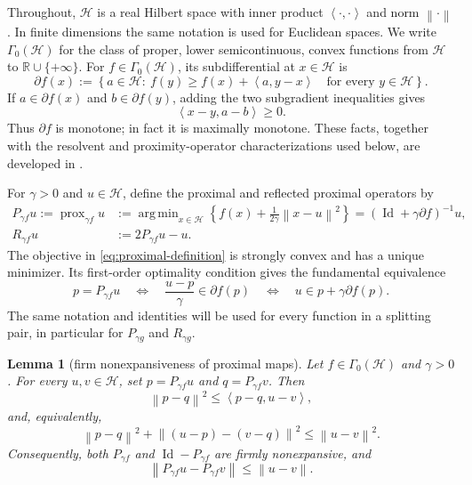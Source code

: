 \documentclass[10pt,leqno]{amsart}
\numberwithin{equation}{section}
\numberwithin{algorithm}{section}
\newtheorem{lemma}[theorem]{Lemma}
\theoremstyle{remark}
\newcommand{\Hcal}{\mathcal{H}}
\newcommand{\R}{\mathbb{R}}
\newcommand{\Id}{\operatorname{Id}}
\newcommand{\subd}{\partial}
\DeclareMathOperator{\prox}{prox}
\DeclareMathOperator{\argmin}{arg\,min}
\newcommand{\norm}[1]{\left\lVert #1 \right\rVert}
\newcommand{\ip}[2]{\left\langle #1,#2 \right\rangle}
\begin{document}
Throughout, $\Hcal$ is a real Hilbert space with inner product $\ip{\cdot}{\cdot}$ and norm $\norm{\cdot}$.  In finite dimensions the same notation is used for Euclidean spaces.  We write $\Gamma_0(\Hcal)$ for the class of proper, lower semicontinuous, convex functions from $\Hcal$ to $\R\cup\{+\infty\}$.  For $f\in\Gamma_0(\Hcal)$, its subdifferential at $x\in\Hcal$ is
\begin{equation}
\label{eq:subdifferential-definition}
  \subd f(x)
  :=\left\{a\in\Hcal:\
  f(y)\ge f(x)+\ip{a}{y-x}\quad\text{for every }y\in\Hcal\right\}.
\end{equation}
If $a\in\subd f(x)$ and $b\in\subd f(y)$, adding the two subgradient inequalities gives
\begin{equation}
\label{eq:subgradient-monotonicity}
  \ip{x-y}{a-b}\ge0.
\end{equation}
Thus $\subd f$ is monotone; in fact it is maximally monotone.  These facts, together with the resolvent and proximity-operator characterizations used below, are developed in \cite[Thm.~20.25, Prop.~23.2, Ex.~23.3, and Prop.~24.1]{BauschkeCombettes2017}.

For $\gamma>0$ and $u\in\Hcal$, define the proximal and reflected proximal operators by
\begin{align}
\label{eq:proximal-definition}
  P_{\gamma f}u
  :=\prox_{\gamma f}u
  &:=\argmin_{x\in\Hcal}
  \left\{f(x)+\frac{1}{2\gamma}\norm{x-u}^2\right\}
  =(\Id+\gamma\subd f)^{-1}u,\\
\label{eq:reflected-proximal-definition}
  R_{\gamma f}u&:=2P_{\gamma f}u-u.
\end{align}
The objective in \eqref{eq:proximal-definition} is strongly convex and has a unique minimizer.  Its first-order optimality condition gives the fundamental equivalence
\begin{equation}
\label{eq:proximal-optimality}
  p=P_{\gamma f}u
  \quad\Longleftrightarrow\quad
  \frac{u-p}{\gamma}\in\subd f(p)
  \quad\Longleftrightarrow\quad
  u\in p+\gamma\subd f(p).
\end{equation}
The same notation and identities will be used for every function in a splitting pair, in particular for $P_{\gamma g}$ and $R_{\gamma g}$.

\begin{lemma}[firm nonexpansiveness of proximal maps]
\label{lem:prox-firmly-nonexpansive}
Let $f\in\Gamma_0(\Hcal)$ and $\gamma>0$.  For every $u,v\in\Hcal$, set $p=P_{\gamma f}u$ and $q=P_{\gamma f}v$.  Then
\begin{equation}
\label{eq:firm}
  \norm{p-q}^2\le \ip{p-q}{u-v},
\end{equation}
and, equivalently,
\begin{equation}
\label{eq:firm-pythagorean}
  \norm{p-q}^2
  +\norm{(u-p)-(v-q)}^2
  \le \norm{u-v}^2.
\end{equation}
Consequently, both $P_{\gamma f}$ and $\Id-P_{\gamma f}$ are firmly nonexpansive, and
\begin{equation}
\label{eq:prox-nonexpansive}
  \norm{P_{\gamma f}u-P_{\gamma f}v}\le\norm{u-v}.
\end{equation}
\end{lemma}
\end{document}

